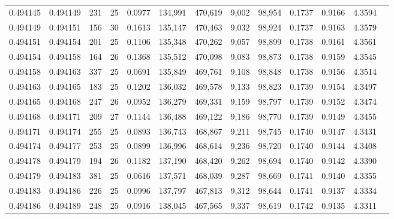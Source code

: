 \begin{tabular}{rrrrrrrrrrrrr}
0.494145 & 0.494149 & 231 &  25 &                                     0.0977 & 134,991 & 470,619 &   9,002 &  98,954 & 0.1737 & 0.9166 & 4.3594 \\
0.494149 & 0.494151 & 156 &  30 &                                     0.1613 & 135,147 & 470,463 &   9,032 &  98,924 & 0.1737 & 0.9163 & 4.3579 \\
0.494151 & 0.494154 & 201 &  25 &                                     0.1106 & 135,348 & 470,262 &   9,057 &  98,899 & 0.1738 & 0.9161 & 4.3561 \\
0.494154 & 0.494158 & 164 &  26 &                                     0.1368 & 135,512 & 470,098 &   9,083 &  98,873 & 0.1738 & 0.9159 & 4.3545 \\
0.494158 & 0.494163 & 337 &  25 &                                     0.0691 & 135,849 & 469,761 &   9,108 &  98,848 & 0.1738 & 0.9156 & 4.3514 \\
0.494163 & 0.494165 & 183 &  25 &                                     0.1202 & 136,032 & 469,578 &   9,133 &  98,823 & 0.1739 & 0.9154 & 4.3497 \\
0.494165 & 0.494168 & 247 &  26 &                                     0.0952 & 136,279 & 469,331 &   9,159 &  98,797 & 0.1739 & 0.9152 & 4.3474 \\
0.494168 & 0.494171 & 209 &  27 &                                     0.1144 & 136,488 & 469,122 &   9,186 &  98,770 & 0.1739 & 0.9149 & 4.3455 \\
0.494171 & 0.494174 & 255 &  25 &                                     0.0893 & 136,743 & 468,867 &   9,211 &  98,745 & 0.1740 & 0.9147 & 4.3431 \\
0.494174 & 0.494177 & 253 &  25 &                                     0.0899 & 136,996 & 468,614 &   9,236 &  98,720 & 0.1740 & 0.9144 & 4.3408 \\
0.494178 & 0.494179 & 194 &  26 &                                     0.1182 & 137,190 & 468,420 &   9,262 &  98,694 & 0.1740 & 0.9142 & 4.3390 \\
0.494179 & 0.494183 & 381 &  25 &                                     0.0616 & 137,571 & 468,039 &   9,287 &  98,669 & 0.1741 & 0.9140 & 4.3355 \\
0.494183 & 0.494186 & 226 &  25 &                                     0.0996 & 137,797 & 467,813 &   9,312 &  98,644 & 0.1741 & 0.9137 & 4.3334 \\
0.494186 & 0.494189 & 248 &  25 &                                     0.0916 & 138,045 & 467,565 &   9,337 &  98,619 & 0.1742 & 0.9135 & 4.3311 \\

\end{tabular}

